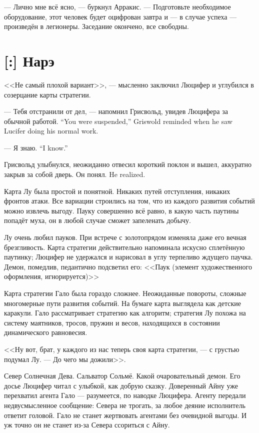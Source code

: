 --- Лично мне всё ясно, --- буркнул Арракис.
--- Подготовьте необходимое оборудование, этот человек будет оцифрован завтра и --- в случае успеха --- произведён в легионеры.
Заседание окончено, все свободны.

\section{[:] Нарэ}

<<Не самый плохой вариант>>, --- мысленно заключил Люцифер и углубился в созерцание карты стратегии.

{--- Тебя отстранили от дел, --- напомнил Грисвольд, увидев Люцифера за обычной работой.}
{``You were suspended,'' Griswold reminded when he saw Lucifer doing his normal work.}

{--- Я знаю.}
{``I know.''}

Грисвольд улыбнулся, неожиданно отвесил короткий поклон и вышел, аккуратно закрыв за собой дверь.
{Он понял.}
{He realized.}

Карта Лу была простой и понятной.
Никаких путей отступления, никаких фронтов атаки.
Все вариации строились на том, что из каждого развития событий можно извлечь выгоду.
Пауку совершенно всё равно, в какую часть паутины попадёт муха, он в любой случае сможет запеленать добычу.

Лу очень любил пауков.
При встрече с золотопрядом изменяла даже его вечная брезгливость.
Карта стратегии действительно напоминала искусно сплетённую паутинку;
Люцифер не удержался и нарисовал в углу терпеливо ждущего паучка.
Демон, помедлив, педантично подсветил его:
<<Паук (элемент художественного оформления, игнорируется)>>

Карта стратегии Гало была гораздо сложнее.
Неожиданные повороты, сложные многомерные пути развития событий.
На бумаге карта выглядела как детские каракули.
Гало рассматривает стратегию как алгоритм;
стратегия Лу похожа на систему маятников, тросов, пружин и весов, находящихся в состоянии динамического равновесия.

<<Ну вот, брат, у каждого из нас теперь своя карта стратегии, --- с грустью подумал Лу.
--- До чего мы дожили>>.

Север Солнечная Дева.
Сальватор Сольмё.
Какой очаровательный демон.
Его досье Люцифер читал с улыбкой, как добрую сказку.
Доверенный Айну уже перехватил агента Гало --- разумеется, по наводке Люцифера.
Агенту передали недвусмысленное сообщение: Севера не трогать, за любое деяние исполнитель ответит головой.
Гало не станет жертвовать агентами без очевидной выгоды.
И уж точно он не станет из-за Севера ссориться с Айну.

